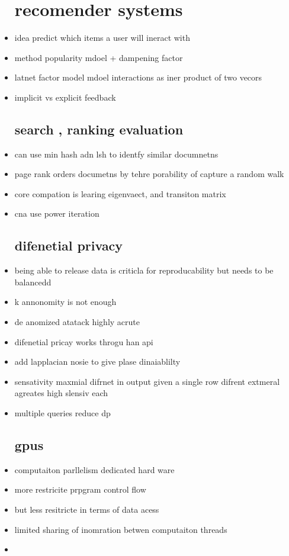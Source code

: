 \documentclass{article}
\begin{document}
\begin{itemize}
\section*{recomender systems }
\item idea predict which items a user will ineract with 
\item method popularity mdoel + dampening factor 
\item latnet factor model mdoel interactions as iner product of two vecors 
\item implicit vs explicit feedback 
\subsection*{search , ranking evaluation}
\item can use min hash adn lsh to identfy similar documnetns 
\item page rank orders documetns by tehre porability of capture a random walk 
\item core compation is learing eigenvaect, and transiton matrix 
\item cna use power iteration 
\subsection*{difenetial privacy}
\item being able to release data is criticla for reproducability but needs to be balancedd
\item k annonomity is not enough 
\item de anomized atatack highly acrute 
\item difenetial pricay works throgu han api 
\item add lapplacian nosie to give plase dinaiablilty 
\item sensativity maxmial difrnet in output given a single row difrent extmeral agreates high slensiv each
\item multiple queries reduce dp 
\subsection*{gpus}
\item computaiton parllelism dedicated hard ware 
\item more restricite prpgram control flow 
\item but less resitricte in terms of data acess 
\item limited sharing of inomration betwen computaiton threads 
\item 
\end{itemize}
\end{document}
